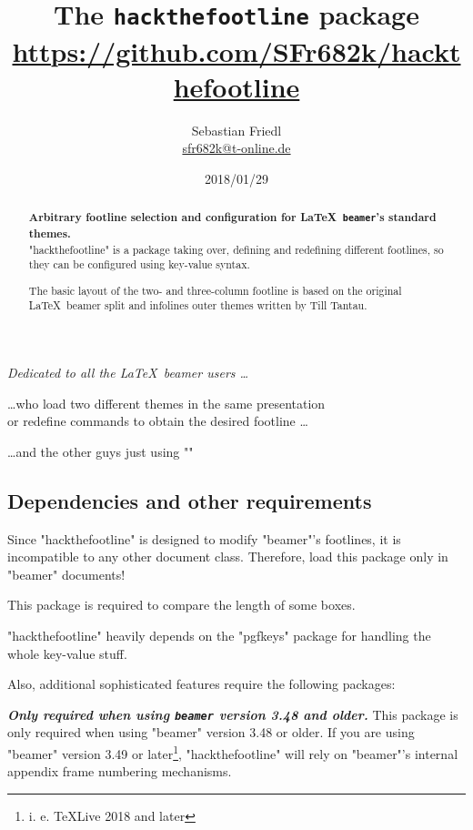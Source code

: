\documentclass[11pt]{ltxdoc}
\title{The \texttt{\bfseries hackthefootline} package \\ {\large\url{https://github.com/SFr682k/hackthefootline}}}
\author{Sebastian Friedl \\ \href{mailto:sfr682k@t-online.de}{\ttfamily sfr682k@t-online.de}}
\date{2018/01/29}
\begin{document}
	\maketitle
	\thispagestyle{empty}
	
	\begin{center} \itshape
		Dedicated to all the \LaTeX\ beamer users \dots
		
		\medskip
		\dots who load two different themes in the same presentation \\ or redefine commands to obtain the desired footline \dots
		
		\medskip
		\dots and the other guys just using "\setbeamertemplate"
	\end{center}
	
	\medskip
	\begin{abstract}
		\parindent0pt\noindent%
		\textbf{Arbitrary footline selection and configuration for \LaTeX\ \texttt{beamer}'s standard themes.} \\
		"hackthefootline" is a package taking over, defining and redefining different footlines, so they can be configured using key-value syntax.
		
		\medskip
		The basic layout of the two- and three-column footline is based on the original \LaTeX\ beamer split and infolines outer themes written by Till Tantau.
	\end{abstract}
	
	
	\tableofcontents
	
	\clearpage
	
	
	
	\subsection*{Dependencies and other requirements}
	Since "hackthefootline" is designed to modify "beamer"'s footlines, it is incompatible to any other document class. Therefore, load this package only in "beamer" documents!
	
	\medskip
	This package is required to compare the length of some boxes.
	
	\medskip
	"hackthefootline" heavily depends on the "pgfkeys" package for handling the whole key-value stuff.
	
	\bigskip
	Also, additional sophisticated features require the following packages:
	
	\medskip
	\textit{\bfseries Only required when using \texttt{beamer} version 3.48 and older.}
	This package is only required when using "beamer" version 3.48 or older. If you are using "beamer" version 3.49 or later\footnote{i. e. \TeX{}Live 2018 and later}, "hackthefootline" will rely on "beamer"'s internal appendix frame numbering mechanisms.
	
\end{document}
